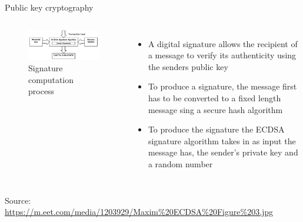 \documentclass[9pt]{beamer}
\begin{document}

\begin{frame}{Public key cryptography}
	\begin{columns}
		\begin{figure}[]
			\centering
			\includegraphics  [scale=0.4]{Images/ECDSA1}
			\caption{Signature computation process}
		\end{figure}
		\begin{itemize}
			\item A digital signature allows the recipient of a message to verify its authenticity using the senders public key
			\item To produce a signature, the message first has to be converted to a fixed length message sing a secure hash algorithm
			\item To produce the signature the ECDSA signature algorithm takes in as input the message has, the sender's private key and a random number
		\end{itemize}
	\end{columns}
	\begin{tiny}
		Source: \href{https://eng.paxos.com/blockchain-separating-hype-from-substance-part-2}{https://m.eet.com/media/1203929/Maxim\%20ECDSA\%20Figure\%203.jpg}
	\end{tiny}
\end{frame}



\end{document}
